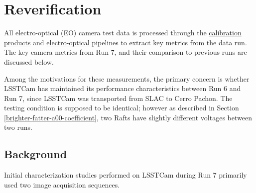 
\clearpage

\section{Reverification}\label{reverification}

All electro-optical (EO) camera test data is processed through the
\underline{\href{https://github.com/lsst/cp_pipe/tree/main}{calibration products}} and
\underline{\href{https://github.com/lsst-camera-dh/eo_pipe/tree/main}{electro-optical}}
pipelines to extract key metrics from the data run. The key camera
metrics from Run 7, and their comparison to previous runs are discussed
below.




Among the motivations for these measurements, the primary concern is whether LSSTCam has
maintained its performance characteristics between Run 6 and Run 7, since LSSTCam was transported from SLAC to Cerro Pachon.
The testing condition is supposed to be identical; however as described in Section \ref{brighter-fatter-a00-coefficient}, two Rafts have slightly different voltages between two runs.

\subsection{Background}\label{background}

Initial characterization studies performed on LSSTCam during Run 7 primarily used two
image acquisition sequences.

